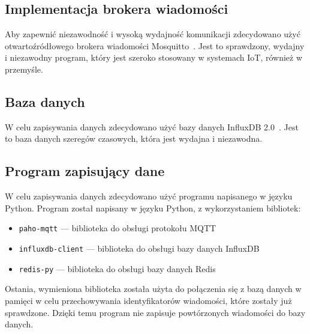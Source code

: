 \subsection{Implementacja brokera wiadomości}
Aby zapewnić niezawodność i wysoką wydajność komunikacji zdecydowano użyć otwartoźródłowego brokera wiadomości Mosquitto~\cite{tool:mosquitto}. Jest to sprawdzony, wydajny i niezawodny program, który jest szeroko stosowany w systemach IoT, również w przemyśle.~\cite{tool:mosquitto}

\subsection{Baza danych}
W celu zapisywania danych zdecydowano użyć bazy danych InfluxDB 2.0~\cite{tool:influxdb}. Jest to baza danych szeregów czasowych, która jest wydajna i niezawodna.~\cite{tool:influxdb}

\subsection{Program zapisujący dane}
W celu zapisywania danych zdecydowano użyć programu napisanego w języku Python. Program został napisany w języku Python, z wykorzystaniem bibliotek:
\begin{itemize}
    \item \texttt{paho-mqtt} — biblioteka do obsługi protokołu MQTT~\cite{py:paho-mqtt}
    \item \texttt{influxdb-client} — biblioteka do obsługi bazy danych InfluxDB~\cite{py:influxdb}
    \item \texttt{redis-py} — biblioteka do obsługi bazy danych Redis~\cite{py:redis}
\end{itemize}
Ostania, wymieniona biblioteka została użyta do połączenia się z bazą danych w pamięci w celu przechowywania identyfikatorów wiadomości, które zostały już sprawdzone. Dzięki temu program nie zapisuje powtórzonych wiadomości do bazy danych.

